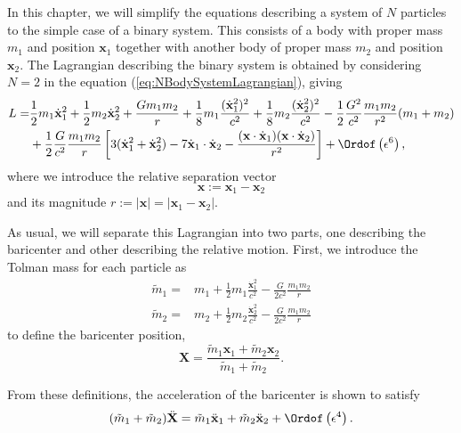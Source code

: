 In this chapter, we will simplify the equations describing a system of $N$ particles to the simple case of a binary system. This consists of a body with proper mass $m_1$ and position $\textbf{x}_1$ together with another body of proper mass $m_2$ and position $\textbf{x}_2$. The Lagrangian describing the binary system is obtained by considering $N=2$ in the equation (\ref{eq:NBodySystemLagrangian}), giving 
\begin{align}
L = &\frac{1}{2} m_1 \dot{\textbf{x}}_1^2 + \frac{1}{2} m_2 \dot{\textbf{x}}_2^2 + \frac{G m_1 m_2}{r} + \frac{1}{8} m_1 \frac{(\dot{\textbf{x}}_1^2)^2}{c^2} + \frac{1}{8} m_2 \frac{(\dot{\textbf{x}}_2^2)^2}{c^2} - \frac{1}{2} \frac{G^2}{c^2} \frac{m_1 m _2}{r^2} (m_1 + m_2) \notag \\
& + \frac{1}{2} \frac{G}{c^2} \frac{m_1 m_2}{r} \left[ 3 (\dot{\textbf{x}}_1^2+ \dot{\textbf{x}}_2^2) - 7 \dot{\textbf{x}}_1 \cdot \dot{\textbf{x}}_2 - \frac{(\textbf{x} \cdot \dot{\textbf{x}}_1) (\textbf{x} \cdot \dot{\textbf{x}}_2)}{r^2} \right]  + \Ordof \left( \epsilon^6 \right), \label{eq:PN2BodyLagrangian1}
\end{align}
where we introduce the relative separation vector 
\begin{equation}
\textbf{x} := \textbf{x}_1 - \textbf{x}_2 \label{eq:PN2BodyRelativePosition}
\end{equation}
and its magnitude $r := \left| \textbf{x} \right| = \left| \textbf{x}_1 - \textbf{x}_2 \right|  $.

As usual, we will separate this Lagrangian into two parts, one describing the baricenter and other describing the relative motion. First, we introduce the Tolman mass for each particle as
\begin{align}
\tilde{m}_1 = & m_1 + \frac{1}{2} m_1 \frac{\dot{\textbf{x}}_1^2}{c^2} - \frac{G}{2c^2} \frac{m_1 m_2}{r} \\
\tilde{m}_2 = & m_2 + \frac{1}{2} m_2 \frac{\dot{\textbf{x}}_2^2}{c^2} - \frac{G}{2c^2} \frac{m_1 m_2}{r} 
\end{align}
to define the baricenter position,
\begin{equation}
\textbf{X} = \frac{\tilde{m}_1 \textbf{x}_1 + \tilde{m}_2 \textbf{x}_2}{\tilde{m}_1 + \tilde{m}_2}. \label{eq:PN2BodyBaricenter}
\end{equation}

From these definitions, the acceleration of the baricenter is shown to satisfy
\begin{equation}
(\tilde{m}_1 + \tilde{m}_2) \ddot{\textbf{X}} = \tilde{m}_1 \ddot{\textbf{x}}_1 + \tilde{m}_2 \ddot{\textbf{x}}_2 + \Ordof \left( \epsilon^4 \right).
\end{equation}

